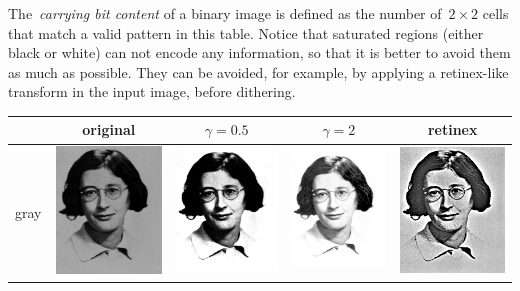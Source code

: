 The~\emph{carrying bit content} of a binary image is defined as the number
of~$2\times2$ cells that match a valid pattern in this table.
Notice that saturated regions (either black or white) can not encode any
information, so that it is better to avoid them as much as possible.
They can be avoided, for example, by applying a retinex-like transform in the
input image, before dithering.

\begin{tabular}{l|cccc}
	&
	original &
	$\gamma=0.5$ &
	$\gamma=2$ &
	retinex \\
	\hline
	gray &
	\includegraphics{i/psimone.png} &
	\includegraphics{psimone-gam.png} &
	\includegraphics{psimone-ugam.png} &
	\includegraphics{psimone-ret.png} \\

\end{tabular}

